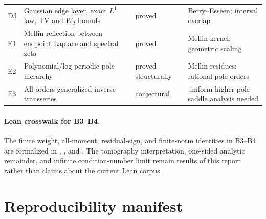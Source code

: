 \documentclass[11pt,oneside]{article}
\numberwithin{equation}{section}
\theoremstyle{definition}
\theoremstyle{remark}
\begin{document}
\begin{longtable}{@{}>{\raggedright\arraybackslash}p{}>{\raggedright\arraybackslash}p{}>{\raggedright\arraybackslash}p{}>{\raggedright\arraybackslash}p{}@{}}
D3 & Gaussian edge layer, exact $L^1$ law, TV and $W_2$ bounds & proved & Berry--Esseen; interval overlap\\
E1 & Mellin reflection between endpoint Laplace and spectral zeta & proved & Mellin kernel; geometric scaling\\
E2 & Polynomial/log-periodic pole hierarchy & proved structurally & Mellin residues; rational pole orders\\
E3 & All-orders generalized inverse transseries & conjectural & uniform higher-pole saddle analysis needed\\
\bottomrule
\end{longtable}

\paragraph{Lean crosswalk for B3--B4.}
The finite weight, all-moment, residual-sign, and finite-norm identities in
B3--B4 are formalized in ,
, and
.  The tomography interpretation,
one-sided analytic remainder, and infinite condition-number limit remain
results of this report rather than claims about the current Lean corpus.

\section{Reproducibility manifest}
\label{app:manifest}
\end{document}
